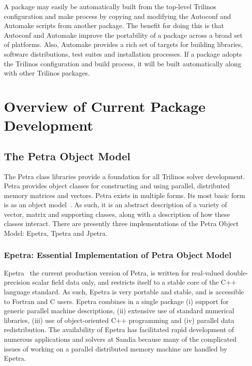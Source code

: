 \documentclass[12pt,relax]{TrilinosOverview}
\begin{document}
A package may easily be automatically built from the top-level
Trilinos configuration and make process by copying and modifying the
Autoconf and Automake scripts from another package.  The benefit for
doing this is that Autoconf and Automake improve the portability of a
package across a broad set of platforms.  Also, Automake provides a
rich set of targets for building libraries, software distributions,
test suites and installation processes.  If a package adopts the
Trilinos configuration and build process, it will be built
automatically along with other Trilinos packages.

\section{Overview of Current Package Development}
\label{sect:Software}

\subsection{The Petra Object Model}
\label{subsect:PetraObjectModel}
The Petra class libraries provide a
foundation for all Trilinos solver development.  Petra provides 
object classes for
constructing and using parallel, distributed memory matrices and vectors.  
Petra exists in
multiple forms.  Its most basic form is as an object 
model~\cite{HeroHoekWill2002}.
As such, it is an abstract 
description of a variety of vector, matrix and supporting classes, along with a 
description of
how these classes interact.  There are presently three implementations
of the Petra Object Model: Epetra, Tpetra and Jpetra.

\subsubsection{Epetra: Essential Implementation of Petra Object Model}

Epetra~\cite{Epetra-Ref-Manual} the current production version of Petra,
 is written for real-valued double-precision scalar field data only, and
restricts itself to a stable core
of the C++ language standard.  As such, Epetra is very portable and 
stable, and  
is accessible to Fortran and C users.  
Epetra combines in a single package (i) support 
for generic parallel
machine descriptions, (ii) extensive use of standard numerical 
libraries, (iii) use of object-oriented C++ programming and (iv) parallel data 
redistribution.  The availability of Epetra has 
facilitated rapid development
of numerous applications and solvers at Sandia because many of the 
complicated issues of
working on a parallel distributed memory machine are handled by Epetra.
\end{document}
